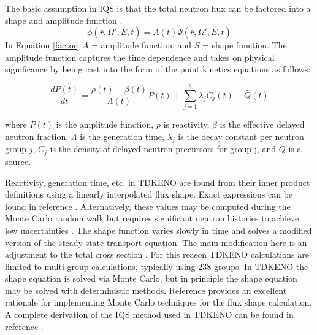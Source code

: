 \documentclass[11pt]{article}
\begin{document}
The basic assumption in IQS is that the total neutron flux can be factored into a shape and amplitude function \cite{Gehin}.  
\begin{equation}
\label{factor}
    \phi(\bar{r},\bar{\Omega}',E,t) = A(t)\Psi(\bar{r},\bar{\Omega}',E,t)
\end{equation}
In Equation \ref{factor} $A$ = amplitude function, and $S$ = shape function.
The amplitude function captures the time dependence and takes on physical significance by being cast into the form of the point kinetics equations as follows:

\begin{equation}
    \label{eq:pt_kin}
    \frac{dP(t)}{dt} = \frac{\rho(t)-\bar{\beta}(t)}{\Lambda(t)} P(t) + \sum_{j=1}^{6} \lambda_jC_j(t) + \bar{Q}(t)
\end{equation}

where $P(t)$ is the amplitude function, $\rho$ is reactivity, $\bar{\beta}$ is the effective delayed neutron fraction, $\Lambda$ is the generation time, $\lambda_j$ is the decay constant per neutron group $j$, $C_j$ is the density of delayed neutron precursors for group j, and $\bar{Q}$ is a source.

 Reactivity, generation time, etc. in TDKENO are found from their inner product definitions using a linearly interpolated flux shape. Exact expressions can be found in reference \cite{Bentley}.  Alternatively, these values may be computed during the Monte Carlo random walk but requires significant neutron histories to achieve low uncertainties \cite{Waddell}.  The shape function varies slowly in time and solves a modified version of the steady state transport equation.  The main modification here is an adjustment to the total cross section \cite{goluoglu2001time}\cite{Gehin}.  For this reason TDKENO calculations are limited to multi-group calculations, typically using 238 groups.  In TDKENO the shape equation is solved via Monte Carlo, but in principle the shape equation may be solved with deterministic methods.  Reference \cite{Shayesteh} provides an excellent rationale for implementing Monte Carlo techniques for the flux shape calculation.  A complete derivation of the IQS method used in TDKENO can be found in reference \cite{Bentley}. 
 
\end{document}
